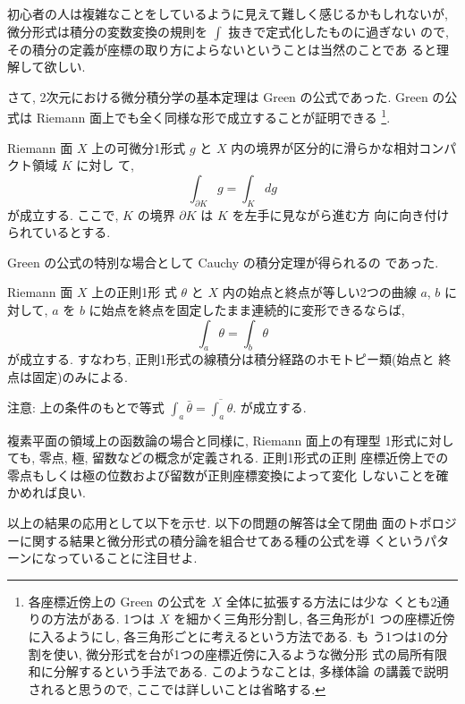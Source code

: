 \documentclass[12pt,twoside]{jarticle}
\def\bdr{\partial}
\begin{document}
初心者の人は複雑なことをしているように見えて難しく感じるかもしれないが,
微分形式は積分の変数変換の規則を $\int$ 抜きで定式化したものに過ぎない
ので, その積分の定義が座標の取り方によらないということは当然のことであ
ると理解して欲しい.

さて, 2次元における微分積分学の基本定理は Green の公式であった. Green 
の公式は Riemann 面上でも全く同様な形で成立することが証明できる%
\footnote{各座標近傍上の Green の公式を $X$ 全体に拡張する方法には少な
  くとも2通りの方法がある. 1つは $X$ を細かく三角形分割し, 各三角形が1
  つの座標近傍に入るようにし, 各三角形ごとに考えるという方法である. も
  う1つは1の分割を使い, 微分形式を台が1つの座標近傍に入るような微分形
  式の局所有限和に分解するという手法である. このようなことは, 多様体論
  の講義で説明されると思うので, ここでは詳しいことは省略する.}.

\medskip

\enspace Riemann 面 $X$ 上の可微分1形式 
$g$ と $X$ 内の境界が区分的に滑らかな相対コンパクト領域 $K$ に対し
て,
\[
  \int_{\bdr K} g = \int_K dg
\] %
が成立する. ここで, $K$ の境界 $\bdr K$ は $K$ を左手に見ながら進む方
向に向き付けられているとする. 

\medskip

\noindent Green の公式の特別な場合として Cauchy の積分定理が得られるの
であった.

\medskip

\enspace Riemann 面 $X$ 上の正則1形
式 $\theta$ と $X$ 内の始点と終点が等しい2つの曲線 $a$, $b$ に対して, %
$a$ を $b$ に始点を終点を固定したまま連続的に変形できるならば,
\[
  \int_a \theta = \int_b \theta
\] %
が成立する. すなわち, 正則1形式の線積分は積分経路のホモトピー類(始点と
終点は固定)のみによる.

\medskip

\noindent 注意: 上の条件のもとで等式 %
\(
  \int_a \bar\theta =  \overline{\int_a\theta}.
\) %
が成立する.

\medskip

\noindent 複素平面の領域上の函数論の場合と同様に, Riemann 面上の有理型
1形式に対しても, 零点, 極, 留数などの概念が定義される. 正則1形式の正則
座標近傍上での零点もしくは極の位数および留数が正則座標変換によって変化
しないことを確かめれば良い.

\medskip

\noindent 以上の結果の応用として以下を示せ. 以下の問題の解答は全て閉曲
面のトポロジーに関する結果と微分形式の積分論を組合せてある種の公式を導
くというパターンになっていることに注目せよ.
\end{document}
